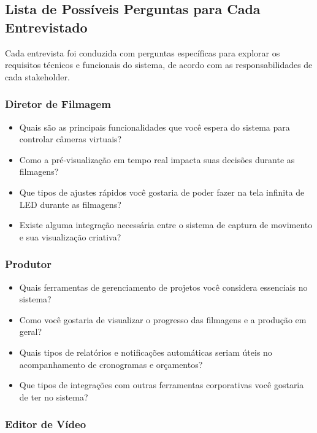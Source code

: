 \subsection{Lista de Possíveis Perguntas para Cada Entrevistado}

Cada entrevista foi conduzida com perguntas específicas para explorar os requisitos técnicos e funcionais do sistema, de acordo com as responsabilidades de cada stakeholder.

\subsubsection{Diretor de Filmagem}

\begin{itemize}
  \item Quais são as principais funcionalidades que você espera do sistema para controlar câmeras virtuais?
  \item Como a pré-visualização em tempo real impacta suas decisões durante as filmagens?
  \item Que tipos de ajustes rápidos você gostaria de poder fazer na tela infinita de LED durante as filmagens?
  \item Existe alguma integração necessária entre o sistema de captura de movimento e sua visualização criativa?
\end{itemize}

\subsubsection{Produtor}

\begin{itemize}
  \item Quais ferramentas de gerenciamento de projetos você considera essenciais no sistema?
  \item Como você gostaria de visualizar o progresso das filmagens e a produção em geral?
  \item Quais tipos de relatórios e notificações automáticas seriam úteis no acompanhamento de cronogramas e orçamentos?
  \item Que tipos de integrações com outras ferramentas corporativas você gostaria de ter no sistema?
\end{itemize}

\subsubsection{Editor de Vídeo}

